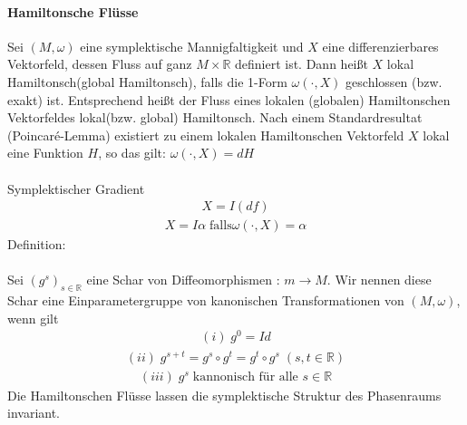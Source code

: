 \documentclass[10pt,a4paper]{article}
\begin{document}
\paragraph{Hamiltonsche Flüsse} $\,$ \\
Sei $ (M,\omega)$ eine symplektische Mannigfaltigkeit und $X$ eine differenzierbares Vektorfeld, dessen Fluss auf ganz $ M \times \mathbb{R}$ definiert ist. Dann heißt $X$ lokal Hamiltonsch(global Hamiltonsch), falls die 1-Form $ \omega (\cdot, X) $ geschlossen (bzw. exakt) ist. Entsprechend heißt der Fluss eines lokalen (globalen) Hamiltonschen Vektorfeldes lokal(bzw. global) Hamiltonsch. Nach einem Standardresultat (Poincaré-Lemma) existiert zu einem lokalen Hamiltonschen Vektorfeld $X$ lokal eine Funktion $H$, so das gilt: $ \omega( \cdot, X)=dH$\\
\\
Symplektischer Gradient
\begin{align}
X=I(df)
\end{align}
\begin{align}
X=I \alpha \; \text{falls} \omega(\cdot, X)= \alpha
\end{align}
Definition:\\
\\
Sei $(g^s)_{s \in \mathbb{R}}$ eine Schar von Diffeomorphismen : $ m \longrightarrow M $. Wir nennen diese Schar eine Einparametergruppe von kanonischen Transformationen von $(M,\omega)$, wenn gilt
\begin{align}
(i) \; g^0=Id
\end{align}
\begin{align}
(ii) \; g^{s+t}=g^s \circ g^t= g^t \circ g^s \; (s,t \in \mathbb{R})
\end{align}
\begin{align}
(iii) \; g^s  \; \text{kannonisch für alle } s \in  \mathbb{R}
\end{align}
Die Hamiltonschen Flüsse lassen die symplektische Struktur des Phasenraums invariant.
\end{document}
